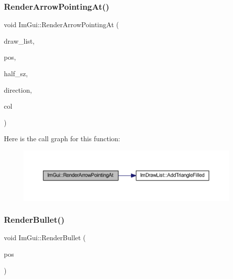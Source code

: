 \subsubsection{\texorpdfstring{Render\+Arrow\+Pointing\+At()}{RenderArrowPointingAt()}}
{\footnotesize\ttfamily void Im\+Gui\+::\+Render\+Arrow\+Pointing\+At (\begin{DoxyParamCaption}\item[{\mbox{\hyperlink{struct_im_draw_list}{Im\+Draw\+List}} $\ast$}]{draw\+\_\+list,  }\item[{\mbox{\hyperlink{struct_im_vec2}{Im\+Vec2}}}]{pos,  }\item[{\mbox{\hyperlink{struct_im_vec2}{Im\+Vec2}}}]{half\+\_\+sz,  }\item[{\mbox{\hyperlink{imgui_8h_a874086389bc27cc9647118d22a806403}{Im\+Gui\+Dir}}}]{direction,  }\item[{\mbox{\hyperlink{imgui_8h_a118cff4eeb8d00e7d07ce3d6460eed36}{Im\+U32}}}]{col }\end{DoxyParamCaption})}

Here is the call graph for this function\+:
\nopagebreak
\begin{figure}[H]
\begin{center}
\leavevmode
\includegraphics[width=350pt]{namespace_im_gui_af1ea568bffa58ec26100de3bf60af5f2_cgraph}
\end{center}
\end{figure}
\mbox{\label{namespace_im_gui_a2d0e4160081b3953fc8f88e2d8e8da15}} 
\subsubsection{\texorpdfstring{Render\+Bullet()}{RenderBullet()}}
{\footnotesize\ttfamily void Im\+Gui\+::\+Render\+Bullet (\begin{DoxyParamCaption}\item[{\mbox{\hyperlink{struct_im_vec2}{Im\+Vec2}}}]{pos }\end{DoxyParamCaption})}


